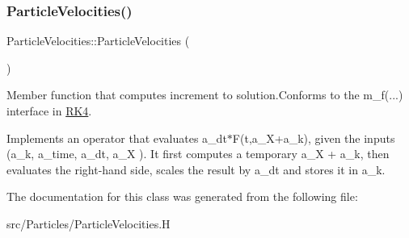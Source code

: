 \subsubsection{\texorpdfstring{Particle\+Velocities()}{ParticleVelocities()}}
{\footnotesize\ttfamily Particle\+Velocities\+::\+Particle\+Velocities (\begin{DoxyParamCaption}{ }\end{DoxyParamCaption})}



Member function that computes increment to solution.\+Conforms to the m\+\_\+f(...) interface in \hyperlink{class_r_k4}{R\+K4}. 

Implements an operator that evaluates a\+\_\+dt$\ast$F(t,a\+\_\+\+X+a\+\_\+k), given the inputs (a\+\_\+k, a\+\_\+time, a\+\_\+dt, a\+\_\+X ). It first computes a temporary a\+\_\+X + a\+\_\+k, then evaluates the right-\/hand side, scales the result by a\+\_\+dt and stores it in a\+\_\+k. 

The documentation for this class was generated from the following file\+:\begin{DoxyCompactItemize}
\item 
src/\+Particles/Particle\+Velocities.\+H\end{DoxyCompactItemize}
